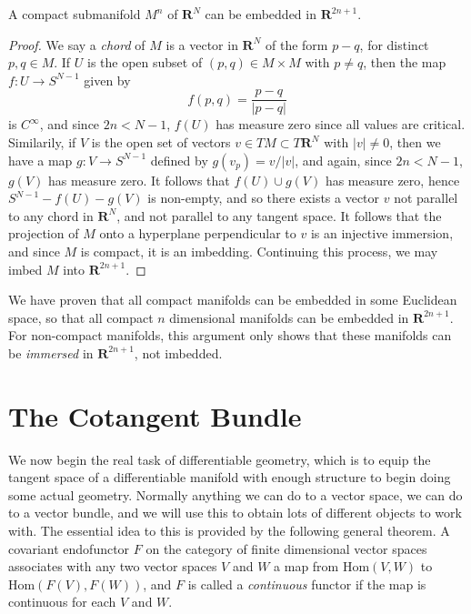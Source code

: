\begin{theorem}
    A compact submanifold $M^n$ of $\mathbf{R}^N$ can be embedded in $\mathbf{R}^{2n+1}$.
\end{theorem}
\begin{proof}
    We say a {\it chord} of $M$ is a vector in $\mathbf{R}^N$ of the form $p - q$, for distinct $p,q \in M$. If $U$ is the open subset of $(p,q) \in M \times M$ with $p \neq q$, then the map $f: U \to S^{N-1}$ given by
    \[ f(p,q) = \frac{p-q}{|p-q|} \]
    is $C^\infty$, and since $2n < N-1$, $f(U)$ has measure zero since all values are critical. Similarily, if $V$ is the open set of vectors $v \in TM \subset T\mathbf{R}^N$ with $|v| \neq 0$, then we have a map $g: V \to S^{N-1}$ defined by $g(v_p) = v/|v|$, and again, since $2n < N-1$, $g(V)$ has measure zero. It follows that $f(U) \cup g(V)$ has measure zero, hence $S^{N-1} - f(U) - g(V)$ is non-empty, and so there exists a vector $v$ not parallel to any chord in $\mathbf{R}^N$, and not parallel to any tangent space. It follows that the projection of $M$ onto a hyperplane perpendicular to $v$ is an injective immersion, and since $M$ is compact, it is an imbedding. Continuing this process, we may imbed $M$ into $\mathbf{R}^{2n+1}$.
\end{proof}

We have proven that all compact manifolds can be embedded in some Euclidean space, so that all compact $n$ dimensional manifolds can be embedded in $\mathbf{R}^{2n+1}$. For non-compact manifolds, this argument only shows that these manifolds can be {\it immersed} in $\mathbf{R}^{2n+1}$, not imbedded.

\chapter{The Cotangent Bundle}

We now begin the real task of differentiable geometry, which is to equip the tangent space of a differentiable manifold with enough structure to begin doing some actual geometry. Normally anything we can do to a vector space, we can do to a vector bundle, and we will use this to obtain lots of different objects to work with. The essential idea to this is provided by the following general theorem. A covariant endofunctor $F$ on the category of finite dimensional vector spaces associates with any two vector spaces $V$ and $W$ a map from $\text{Hom}(V,W)$ to $\text{Hom}(F(V),F(W))$, and $F$ is called a {\it continuous} functor if the map is continuous for each $V$ and $W$.

